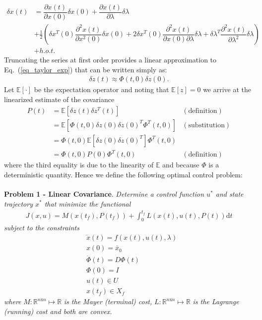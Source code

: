 \documentclass[10pt,a4paper]{article}
\begin{document}
	\begin{align}
	\delta x(t) &= \dfrac{\partial x(t)}{\partial x(0)} \delta x(0) + \dfrac{\partial x(t)}{\partial \lambda} \delta \lambda \nonumber\\
	&+\frac{1}{2}\left(\delta x^T(0) \dfrac{\partial^2 x(t)}{\partial x^2(0)} \delta x(0) + 2\delta x^T(0)\dfrac{\partial^2 x(t)}{\partial x(0)\partial\lambda} \delta \lambda +\delta \lambda^T \dfrac{\partial^2 x(t)}{\partial \lambda^2} \delta \lambda\right) \label{eq_taylor_exp}\\
	\nonumber &+ h.o.t.
	\end{align}
	Truncating the series at first order provides a linear approximation to Eq.~(\ref{eq_taylor_exp}) that can be written simply as:
	\begin{align}
	\delta z(t) \approx \Phi(t,0)\delta z(0).
	\end{align}
	Let $\mathbb{E}[\cdot]$ be the expectation operator and noting that $\mathbb{E}[z]=0$ we arrive at the linearized estimate of the covariance
	\begin{align}
	P(t) &= \mathbb{E}[\delta z(t)\delta z^T(t)] &\mathrm{ (definition)} \\
	     &= \mathbb{E}[\Phi(t,0)\delta z(0)\delta z(0)^T\Phi^T(t,0)] &\mathrm{(substitution)} \\
	     &= \Phi(t,0)\mathbb{E}[\delta z(0)\delta z(0)^T] \Phi^T(t,0) \\
	     &= \Phi(t,0)P(0)\Phi^T(t,0) &\mathrm{ (definition)}
	\end{align}
	where the third equality is due to the linearity of $\mathbb{E}$ and because $\Phi$ is a deterministic quantity. Hence we define the following optimal control problem:
	\\\\
	\textbf{Problem 1 - Linear Covariance}. \textit{Determine a control function $ u^* $ and state trajectory $ x^* $ that minimize the functional}
	\begin{align}
	J(x,u) = M(x(t_f),P(t_f)) + \int_{0}^{t_f}L(x(t),u(t),P(t))\mathrm{d}t
	\end{align}
	\textit{	subject to the constraints }
	\begin{align}
	&\dot{x}(t) = f(x(t),u(t),\lambda) \\
	&x(0) = \bar{x}_0 \\
	&\dot{\Phi}(t) = D\Phi(t) \\
	&\Phi(0) = I \\
	&u(t) \in U \\
	&x(t_f) \in X_f
	\end{align}
	\textit{where} $ M:\mathbb{R}^{n\mathrm{x}n}\mapsto \mathbb{R} $ \textit{is the Mayer (terminal) cost,}  $L:\mathbb{R}^{n\mathrm{x}n}\mapsto\mathbb{R}$ \textit{ is the Lagrange (running) cost and both are convex.}
	
\end{document}
